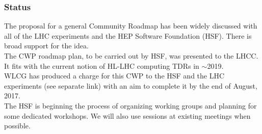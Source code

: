 \begin{frame}
\frametitle{Status}

\noindent 
The proposal for a general Community Roadmap has been widely discussed with all of the LHC experiments and the HEP Software Foundation (HSF). There is broad support for the idea. \\
\vskip 0.1in
The CWP roadmap plan, to be carried out by HSF, was presented to the LHCC. It fits with the current notion of HL-LHC computing TDRs in $\sim$2019.\\
\vskip 0.1in
WLCG has produced a charge for this CWP to the HSF and the LHC experiments (see separate link) with an aim to complete it by the end of August, 2017. \\
\vskip 0.1in
The HSF is beginning the process of organizing working groups and planning for 
some dedicated workshops. We will also use sessions at existing meetings when possible. \\

\end{frame}


